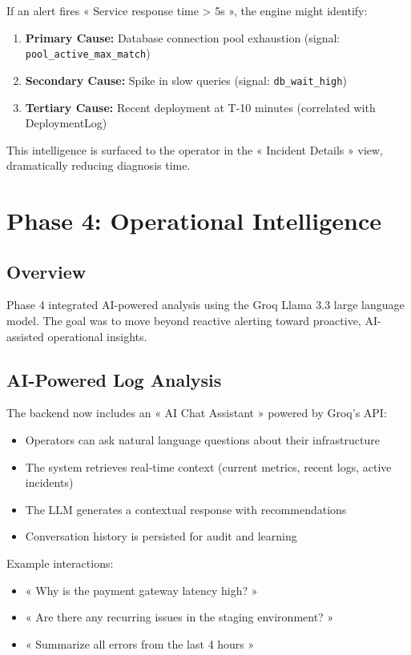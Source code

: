 \documentclass[12pt,a4paper]{report}
\begin{document}
If an alert fires « Service response time > 5s », the engine might identify:
\begin{enumerate}
  \item \textbf{Primary Cause:} Database connection pool exhaustion (signal: \texttt{pool\_active\_max\_match})
  \item \textbf{Secondary Cause:} Spike in slow queries (signal: \texttt{db\_wait\_high})
  \item \textbf{Tertiary Cause:} Recent deployment at T-10 minutes (correlated with DeploymentLog)
\end{enumerate}

This intelligence is surfaced to the operator in the « Incident Details » view, dramatically reducing diagnosis time.

\section{Phase 4: Operational Intelligence}

\subsection{Overview}

Phase 4 integrated AI-powered analysis using the Groq Llama 3.3 large language model. The goal was to move beyond reactive alerting toward proactive, AI-assisted operational insights.

\subsection{AI-Powered Log Analysis}

The backend now includes an « AI Chat Assistant » powered by Groq's API:

\begin{itemize}
  \item Operators can ask natural language questions about their infrastructure
  \item The system retrieves real-time context (current metrics, recent logs, active incidents)
  \item The LLM generates a contextual response with recommendations
  \item Conversation history is persisted for audit and learning
\end{itemize}

Example interactions:
\begin{itemize}
  \item « Why is the payment gateway latency high? »
  \item « Are there any recurring issues in the staging environment? »
  \item « Summarize all errors from the last 4 hours »
\end{itemize}
\end{document}
